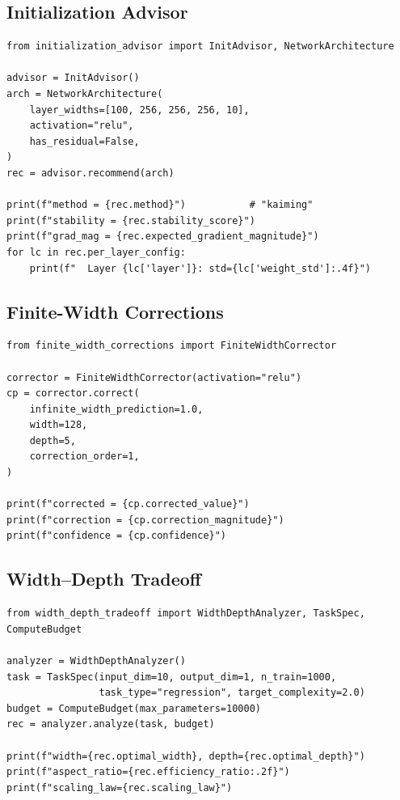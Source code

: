 \documentclass[10pt]{article}
\theoremstyle{definition}
\begin{document}
\subsection{Initialization Advisor}

\begin{lstlisting}
from initialization_advisor import InitAdvisor, NetworkArchitecture

advisor = InitAdvisor()
arch = NetworkArchitecture(
    layer_widths=[100, 256, 256, 256, 10],
    activation="relu",
    has_residual=False,
)
rec = advisor.recommend(arch)

print(f"method = {rec.method}")           # "kaiming"
print(f"stability = {rec.stability_score}")
print(f"grad_mag = {rec.expected_gradient_magnitude}")
for lc in rec.per_layer_config:
    print(f"  Layer {lc['layer']}: std={lc['weight_std']:.4f}")
\end{lstlisting}

\subsection{Finite-Width Corrections}

\begin{lstlisting}
from finite_width_corrections import FiniteWidthCorrector

corrector = FiniteWidthCorrector(activation="relu")
cp = corrector.correct(
    infinite_width_prediction=1.0,
    width=128,
    depth=5,
    correction_order=1,
)

print(f"corrected = {cp.corrected_value}")
print(f"correction = {cp.correction_magnitude}")
print(f"confidence = {cp.confidence}")
\end{lstlisting}

\subsection{Width--Depth Tradeoff}

\begin{lstlisting}
from width_depth_tradeoff import WidthDepthAnalyzer, TaskSpec, ComputeBudget

analyzer = WidthDepthAnalyzer()
task = TaskSpec(input_dim=10, output_dim=1, n_train=1000,
                task_type="regression", target_complexity=2.0)
budget = ComputeBudget(max_parameters=10000)
rec = analyzer.analyze(task, budget)

print(f"width={rec.optimal_width}, depth={rec.optimal_depth}")
print(f"aspect_ratio={rec.efficiency_ratio:.2f}")
print(f"scaling_law={rec.scaling_law}")
\end{lstlisting}
\end{document}

